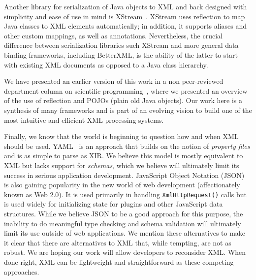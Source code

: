 Another library for serialization of Java objects to XML and back
designed with simplicity and ease of use in mind is
XStream~\cite{xstream}. XStream uses reflection to map Java classes to
XML elements automatically; in addition, it supports aliases and other
custom mappings, as well as annotations. Nevertheless, the crucial
difference between serialization libraries such XStream and more
general data binding frameworks, including BetterXML, is the ability
of the latter to start with existing XML documents as opposed to a
Java class hierarchy.

We have presented an earlier version of this work in a non
peer-reviewed department column on scientific
programming~\cite{gkt:natXml04}, where we presented an overview of the
use of reflection and POJOs (plain old Java objects). Our work here is
a synthesis of many frameworks and is part of an evolving vision to
build one of the most intuitive and efficient XML processing systems.

Finally, we know that the world is beginning to question how and when
XML should be used. YAML~\cite{yaml} is an approach that builds on the
notion of \emph{property files} and is as simple to parse as XIR. We
believe this model is mostly equivalent to XML but lacks support for
\emph{schemas}, which we believe will ultimately limit its success in
serious application development.  JavaScript Object Notation
(JSON)~\cite{json} is also gaining popularity in the new world of web
development (affectionately known as Web 2.0). It is used primarily in
handling \lstinline{XmlHttpRequest()} calls but is used widely for
initializing state for plugins and other JavaScript data
structures. While we believe JSON to be a good approach for this
purpose, the inability to do meaningful type checking and schema
validation will ultimately limit its use outside of web
applications. We mention these alternatives to make it clear that
there are alternatives to XML that, while tempting, are not as
robust. We are hoping our work will allow developers to reconsider
XML. When done right, XML can be lightweight and straightforward as
these competing approaches.
